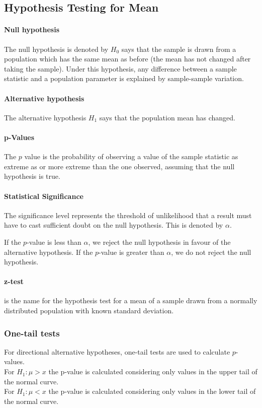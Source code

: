 \documentclass[a4paper,twoside,10pt]{article}
\begin{document}
		\subsection{Hypothesis Testing for Mean}
			\paragraph{Null hypothesis} The null hypothesis is denoted by $H_0$ says that the sample is drawn from a population which has the same mean as before (the mean has not changed after taking the sample). Under this hypothesis, any difference between a sample statistic and a population parameter is explained by sample-sample variation.
			
			\paragraph{Alternative hypothesis} The alternative hypothesis $H_1$ says that the population mean has changed.
			
			\paragraph{p-Values} The $p$ value is the probability of observing a value of the sample statistic as extreme as or more extreme than the one observed, assuming that the null hypothesis is true.
			
			\paragraph{Statistical Significance} The significance level represents the threshold of unlikelihood that a result must have to cast sufficient doubt on the null hypothesis. This is denoted by $\alpha$.
			
			If the $p$-value is less than $\alpha$, we reject the null hypothesis in favour of the alternative hypothesis. If the $p$-value is greater than $\alpha$, we do not reject the null hypothesis.
			
			\paragraph{z-test} is the name for the hypothesis test for a mean of a sample drawn from a normally distributed population with known standard deviation.
			
			\subsubsection{One-tail tests}
				For directional alternative hypotheses, one-tail tests are used to calculate $p$-values.\\
				For $H_1:\mu>x$ the p-value is calculated considering only values in the upper tail of the normal curve.\\
				For $H_1:\mu<x$ the p-value is calculated considering only values in the lower tail of the normal curve.\\
\end{document}
